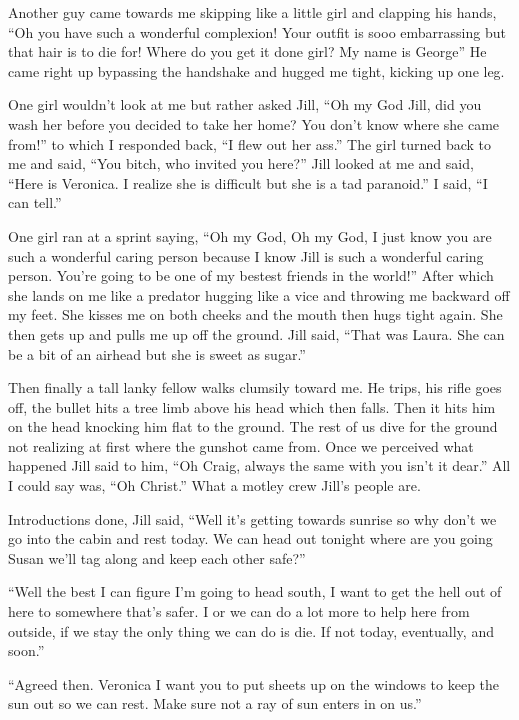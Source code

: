 Another guy came towards me skipping like a little girl and clapping his hands, ``Oh you have such a wonderful complexion! Your outfit is sooo embarrassing but that hair is to die for! Where do you get it done girl? My name is George'' He came right up bypassing the handshake and hugged me tight, kicking up one leg.

One girl wouldn't look at me but rather asked Jill, ``Oh my God Jill, did you wash her before you decided to take her home? You don't know where she came from!'' to which I responded back, ``I flew out her ass.'' The girl turned back to me and said, ``You bitch, who invited you here?'' Jill looked at me and said, ``Here is Veronica. I realize she is difficult but she is a tad paranoid.'' I said, ``I can tell.''

One girl ran at a sprint saying, ``Oh my God, Oh my God, I just know you are such a wonderful caring person because I know Jill is such a wonderful caring person. You're going to be one of my bestest friends in the world!'' After which she lands on me like a predator hugging like a vice and throwing me backward off my feet. She kisses me on both cheeks and the mouth then hugs tight again. She then gets up and pulls me up off the ground. Jill said, ``That was Laura. She can be a bit of an airhead but she is sweet as sugar.''

Then finally a tall lanky fellow walks clumsily toward me. He trips, his rifle goes off, the bullet hits a tree limb above his head which then falls. Then it hits him on the head knocking him flat to the ground. The rest of us dive for the ground not realizing at first where the gunshot came from. Once we perceived what happened Jill said to him, ``Oh Craig, always the same with you isn't it dear.'' All I could say was, ``Oh Christ.'' What a motley crew Jill's people are.

Introductions done, Jill said, ``Well it's getting towards sunrise so why don't we go into the cabin and rest today. We can head out tonight where are you going Susan we'll tag along and keep each other safe?''

``Well the best I can figure I'm going to head south, I want to get the hell out of here to somewhere that's safer. I or we can do a lot more to help here from outside, if we stay the only thing we can do is die. If not today, eventually, and soon.''

``Agreed then. Veronica I want you to put sheets up on the windows to keep the sun out so we can rest. Make sure not a ray of sun enters in on us.''

